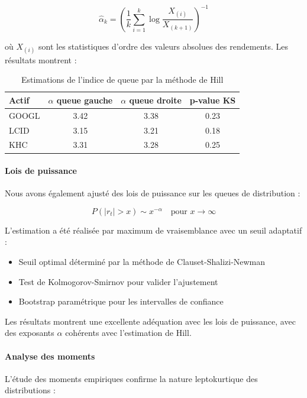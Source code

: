 \documentclass[12pt,a4paper]{article}
\theoremstyle{definition}
\theoremstyle{remark}
\begin{document}
\begin{equation}
\hat{\alpha}_k = \left(\frac{1}{k} \sum_{i=1}^k \log \frac{X_{(i)}}{X_{(k+1)}}\right)^{-1}
\end{equation}

où $X_{(i)}$ sont les statistiques d'ordre des valeurs absolues des rendements. Les résultats montrent :

\begin{table}[h!]
\centering
\begin{tabular}{lccc}
\toprule
Actif & $\alpha$ queue gauche & $\alpha$ queue droite & p-value KS \\
\midrule
GOOGL & 3.42 & 3.38 & 0.23 \\
LCID & 3.15 & 3.21 & 0.18 \\
KHC & 3.31 & 3.28 & 0.25 \\
\bottomrule
\end{tabular}
\caption{Estimations de l'indice de queue par la méthode de Hill}
\end{table}

\paragraph{Lois de puissance}
Nous avons également ajusté des lois de puissance sur les queues de distribution :

\begin{equation}
P(|r_t| > x) \sim x^{-\alpha} \quad \text{pour } x \to \infty
\end{equation}

L'estimation a été réalisée par maximum de vraisemblance avec un seuil adaptatif :

\begin{itemize}
    \item Seuil optimal déterminé par la méthode de Clauset-Shalizi-Newman
    \item Test de Kolmogorov-Smirnov pour valider l'ajustement
    \item Bootstrap paramétrique pour les intervalles de confiance
\end{itemize}

Les résultats montrent une excellente adéquation avec les lois de puissance, avec des exposants $\alpha$ cohérents avec l'estimation de Hill.

\paragraph{Analyse des moments}
L'étude des moments empiriques confirme la nature leptokurtique des distributions :
\end{document}
